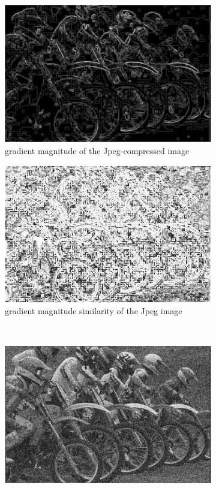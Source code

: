 \begin{figure}
\begin{subfigure}[b]{0.3\textwidth}
         \includegraphics[width=\textwidth]{./figs/jpeg_mag}
         \caption{gradient magnitude of the Jpeg-compressed image}
         \label{fig:gmsd_jpeg_mag}
     \end{subfigure}
     \hfill
     \begin{subfigure}[b]{0.3\textwidth}
         \centering
         \includegraphics[width=\textwidth]{./figs/jpeg_sim}
         \caption{gradient magnitude similarity of the Jpeg image}
         \label{fig:gmsd_jpeg_sim}
     \end{subfigure}
     \\
     \begin{subfigure}[b]{0.3\textwidth}
         \centering
         \includegraphics[width=\textwidth]{./figs/noise_gry}

\end{subfigure}
\end{figure}
